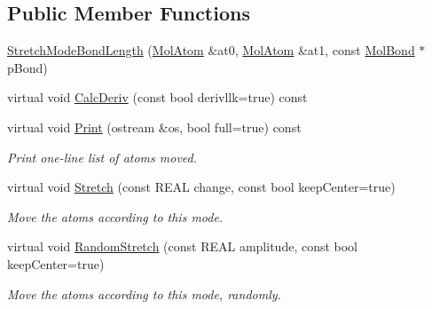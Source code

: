 \subsection*{Public Member Functions}
\begin{DoxyCompactItemize}
\item 
\mbox{\hyperlink{struct_obj_cryst_1_1_stretch_mode_bond_length_aa04e0fdc910b1fcbb25de4de51d32455}{Stretch\+Mode\+Bond\+Length}} (\mbox{\hyperlink{class_obj_cryst_1_1_mol_atom}{Mol\+Atom}} \&at0, \mbox{\hyperlink{class_obj_cryst_1_1_mol_atom}{Mol\+Atom}} \&at1, const \mbox{\hyperlink{class_obj_cryst_1_1_mol_bond}{Mol\+Bond}} $\ast$p\+Bond)
\item 
virtual void \mbox{\hyperlink{struct_obj_cryst_1_1_stretch_mode_bond_length_ab418eb610ae49059454ca1a2fe7fb9a3}{Calc\+Deriv}} (const bool derivllk=true) const
\item 
\mbox{\label{struct_obj_cryst_1_1_stretch_mode_bond_length_aadefdefbd6a5320b64f865709688cb38}} 
virtual void \mbox{\hyperlink{struct_obj_cryst_1_1_stretch_mode_bond_length_aadefdefbd6a5320b64f865709688cb38}{Print}} (ostream \&os, bool full=true) const
\begin{DoxyCompactList}\small\item\em Print one-\/line list of atoms moved. \end{DoxyCompactList}\item 
\mbox{\label{struct_obj_cryst_1_1_stretch_mode_bond_length_afe7d7a7ce74c5ae5a0a662e0d1ecfb75}} 
virtual void \mbox{\hyperlink{struct_obj_cryst_1_1_stretch_mode_bond_length_afe7d7a7ce74c5ae5a0a662e0d1ecfb75}{Stretch}} (const R\+E\+AL change, const bool keep\+Center=true)
\begin{DoxyCompactList}\small\item\em Move the atoms according to this mode. \end{DoxyCompactList}\item 
\mbox{\label{struct_obj_cryst_1_1_stretch_mode_bond_length_a22179068aaf70ee72c16ef8794bd738a}} 
virtual void \mbox{\hyperlink{struct_obj_cryst_1_1_stretch_mode_bond_length_a22179068aaf70ee72c16ef8794bd738a}{Random\+Stretch}} (const R\+E\+AL amplitude, const bool keep\+Center=true)
\begin{DoxyCompactList}\small\item\em Move the atoms according to this mode, randomly. \end{DoxyCompactList}\end{DoxyCompactItemize}
